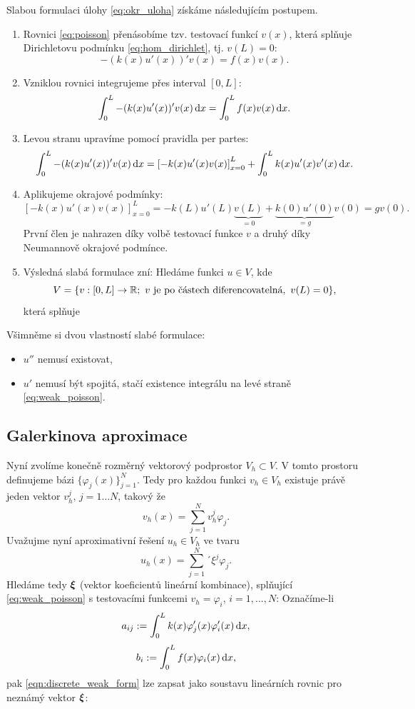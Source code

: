 Slabou formulaci úlohy \eqref{eq:okr_uloha} získáme následujícím postupem.
\begin{enumerate}
\item Rovnici \eqref{eq:poisson} přenásobíme tzv. testovací funkcí $v(x)$, která splňuje Dirichletovu podmínku \eqref{eq:hom_dirichlet}, tj. $v(L)=0$:
\[ -(k(x)u'(x))'v(x) = f(x)v(x). \]

\item Vzniklou rovnici integrujeme přes interval $[0,L]$:
\[ \int_0^L -(k(x)u'(x))'v(x) \,{\rm d} x = \int_0^L f(x)v(x) \,{\rm d} x. \]

\item Levou stranu upravíme pomocí pravidla per partes:
\[ \int_0^L -(k(x)u'(x))'v(x) \,{\rm d} x = \left[-k(x)u'(x)v(x)\right]_{x=0}^L + \int_0^L k(x)u'(x)v'(x) \,{\rm d} x. \]

\item Aplikujeme okrajové podmínky:
\[ \left[-k(x)u'(x)v(x)\right]_{x=0}^L = -k(L)u'(L)\underbrace{v(L)}_{=0} + \underbrace{k(0)u'(0)}_{=g}v(0) = gv(0). \]
První člen je nahrazen díky volbě testovací funkce $v$ a druhý díky Neumannově okrajové podmínce.

\item Výsledná slabá formulace zní: Hledáme funkci $u\in V$, kde
\[ V=\{v:[0,L]\rightarrow{\mathbb R};~v \mbox{ je po částech diferencovatelná},~v(L)=0\}, \]
která splňuje
\end{enumerate}


Všimněme si dvou vlastností slabé formulace:
\begin{itemize}
  \item $u''$ nemusí existovat,
  \item $u'$ nemusí být spojitá, stačí existence integrálu na levé straně \eqref{eq:weak_poisson}.
\end{itemize}



\subsection{Galerkinova aproximace}
Nyní zvolíme konečně rozměrný vektorový podprostor $V_h\subset V$.
V tomto prostoru definujeme bázi $\{\varphi_j(x)\}_{j=1}^N$.
Tedy pro každou funkci $v_h\in V_h$ existuje právě jeden vektor $v_h^j,\, j=1\ldots N$,
takový že 
\[
  v_h(x) = \sum\limits_{j=1}^N v_h^j \varphi_j.
\]
% 
Uvažujme nyní aproximativní řešení $u_h\in V_h$ ve tvaru
\[
  u_h(x) = \sum\limits_{j=1}^N ´\xi^j \varphi_j.
\]
% 
Hledáme tedy $\mathbf{\boldsymbol{\xi}}$ (vektor  koeficientů lineární kombinace), splňující \eqref{eq:weak_poisson} s testovacími funkcemi $v_h=\varphi_i$, $i=1,...,N$:
% 
Označíme-li
\[ a_{ij} := \int_0^L k(x) \varphi'_j(x) \varphi_i'(x) \,{\rm d} x, \]
\[ b_i := \int_0^L f(x) \varphi_i(x) \,{\rm d} x, \]
pak \eqref{eqn:discrete_weak_form} lze zapsat jako soustavu lineárních rovnic pro neznámý vektor $\mathbf{\boldsymbol{\xi}}$:

